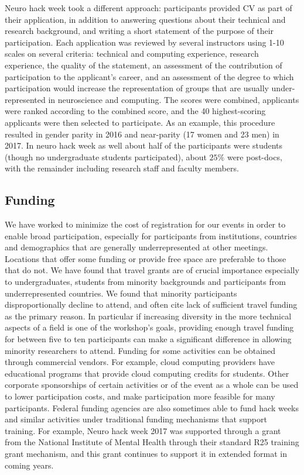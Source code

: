\documentclass{nature}
\begin{document}
Neuro hack week took a different approach: participants provided CV as part of their application, in addition to answering questions about their technical and research background, and writing a short statement of the purpose of their participation. Each application was reviewed by several instructors using 1-10 scales on several criteria: technical and computing experience, research experience, the quality of the statement, an assessment of the contribution of participation to the applicant's career, and an assessment of the degree to which participation would increase the representation of groups that are usually under-represented in neuroscience and computing. The scores were combined, applicants were ranked according to the combined score, and the 40 highest-scoring applicants were then selected to participate. As an example,  this procedure resulted in gender parity in 2016 and near-parity (17 women and 23 men) in 2017. In neuro hack week as well about half of the participants were students (though no undergraduate students participated), about $25\%$ were post-docs, with the remainder including research staff and faculty members.

\subsection{Funding}

We have worked to minimize the cost of registration for our events in order to enable broad participation, especially for participants from institutions, countries and demographics that are generally underrepresented at other meetings. Locations that offer some funding or provide free space are preferable to those that do not.
We have found that travel grants are of crucial importance especially to undergraduates, students from minority backgrounds and participants from underrepresented countries. We found that minority participants disproportionally decline to attend, and often cite lack of sufficient travel funding as the primary reason. In particular if increasing diversity in the more technical aspects of a field is one of the workshop's goals, providing enough travel funding for between five to ten participants can make a significant difference in allowing minority researchers to attend.
Funding for some activities can be obtained through commercial vendors.
For example, cloud computing providers have educational programs that provide cloud computing credits for students.
Other corporate sponsorships of certain activities or of the event as a whole can be used to lower participation costs, and make participation more feasible for many participants.
Federal funding agencies are also sometimes able to fund hack weeks and similar activities under traditional funding mechanisms that support training. For example, Neuro hack week 2017 was supported through a grant from the National Institute of Mental Health through their standard R25 training grant mechanism, and this grant continues to support it in extended format in coming years.
\end{document}
